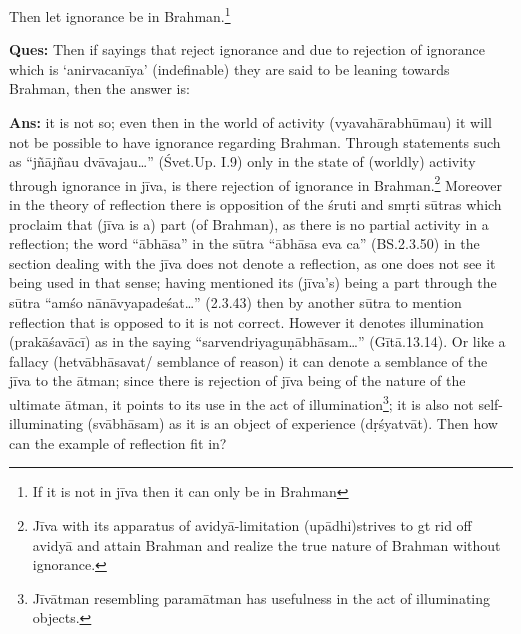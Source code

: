 
Then let ignorance be in Brahman.\footnote{If it is not in jīva then it can only be in Brahman} 

\textbf{Ques:} Then if sayings that reject ignorance and due to rejection of ignorance which is ‘anirvacanīya’ (indefinable) they are said to be leaning towards Brahman, then the answer is: 

\textbf{Ans:} it is not so; even then in the world of activity (vyavahārabhūmau) it will not be possible to have ignorance regarding Brahman.  Through statements such as “jñājñau dvāvajau…” (Śvet.Up. I.9) only in the state of (worldly) activity through ignorance in jīva, is there rejection of ignorance in Brahman.\footnote{Jīva with its apparatus of avidyā-limitation (upādhi)strives to gt rid off avidyā and attain Brahman and realize the true nature of Brahman without ignorance.} Moreover in the theory of reflection there is opposition of the śruti and smṛti sūtras which proclaim that (jīva is a) part (of Brahman), as there is no partial activity in a reflection;  the word “ābhāsa” in the sūtra “ābhāsa eva ca” (BS.2.3.50) in the section dealing with the jīva does not denote a reflection, as one does not see it being used in that sense; having mentioned its (jīva’s) being a part through the sūtra “amśo nānāvyapadeśat…” (2.3.43) then by another sūtra to mention reflection that is opposed to it is not correct. However it denotes illumination (prakāśavācī) as in the saying “sarvendriyaguṇābhāsam…” (Gītā.13.14). Or like a fallacy (hetvābhāsavat/ semblance of reason) it can denote a semblance of the jīva to the ātman;  since there is rejection of jīva being of the nature of the ultimate ātman, it points to its use in the act of illumination\footnote{Jīvātman resembling paramātman has usefulness in the act of illuminating objects.}; it is also not self-illuminating (svābhāsam) as it is an object of experience (dṛśyatvāt).   Then how can the example of reflection fit in? 

